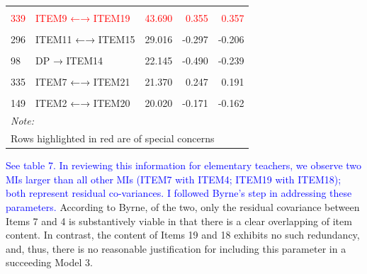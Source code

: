 \documentclass[
]{article}
\begin{document}
\begin{table}
\begin{tabular}[t]{llrrr}
\hspace{1em}\textcolor{red}{\cellcolor{gray!6}{821}} & \textcolor{red}{\cellcolor{gray!6}{EE → ITEM11}} & \textcolor{red}{\cellcolor{gray!6}{67.177}} & \textcolor{red}{\cellcolor{gray!6}{0.472}} & \textcolor{red}{\cellcolor{gray!6}{0.339}}\\
\hspace{1em}\textcolor{red}{339} & \textcolor{red}{ITEM9 ←→ ITEM19} & \textcolor{red}{43.690} & \textcolor{red}{0.355} & \textcolor{red}{0.357}\\
\hspace{1em}\cellcolor{gray!6}{276} & \cellcolor{gray!6}{ITEM5 ←→ ITEM15} & \cellcolor{gray!6}{35.576} & \cellcolor{gray!6}{0.416} & \cellcolor{gray!6}{0.310}\\
\hspace{1em}296 & ITEM11 ←→ ITEM15 & 29.016 & -0.297 & -0.206\\
\hspace{1em}\cellcolor{gray!6}{247} & \cellcolor{gray!6}{ITEM16 ←→ ITEM20} & \cellcolor{gray!6}{28.900} & \cellcolor{gray!6}{0.227} & \cellcolor{gray!6}{0.201}\\
\hspace{1em}98 & DP → ITEM14 & 22.145 & -0.490 & -0.239\\
\hspace{1em}\cellcolor{gray!6}{345} & \cellcolor{gray!6}{ITEM17 ←→ ITEM18} & \cellcolor{gray!6}{21.583} & \cellcolor{gray!6}{0.147} & \cellcolor{gray!6}{0.219}\\
\hspace{1em}335 & ITEM7 ←→ ITEM21 & 21.370 & 0.247 & 0.191\\
\hspace{1em}\cellcolor{gray!6}{346} & \cellcolor{gray!6}{ITEM17 ←→ ITEM19} & \cellcolor{gray!6}{20.742} & \cellcolor{gray!6}{-0.159} & \cellcolor{gray!6}{-0.217}\\
\hspace{1em}149 & ITEM2 ←→ ITEM20 & 20.020 & -0.171 & -0.162\\
\bottomrule
\multicolumn{5}{l}{\rule{0pt}{1em}\textit{Note: }}\\
\multicolumn{5}{l}{\rule{0pt}{1em}Rows highlighted in red are of special concerns}\\
\end{tabular}
\end{table}

\textcolor{blue}{See table 7. In reviewing this information for elementary teachers, we observe two MIs larger than all other MIs (ITEM7 with ITEM4; ITEM19 with ITEM18); both represent residual co-variances. I followed Byrne's step in addressing these parameters.} According to Byrne, of the two, only the residual covariance between Items 7 and 4 is substantively viable in that there is a clear overlapping of item content. In contrast, the content of Items 19 and 18 exhibits no such redundancy, and, thus, there is no reasonable justification for including this parameter in a succeeding Model 3.
\end{document}
